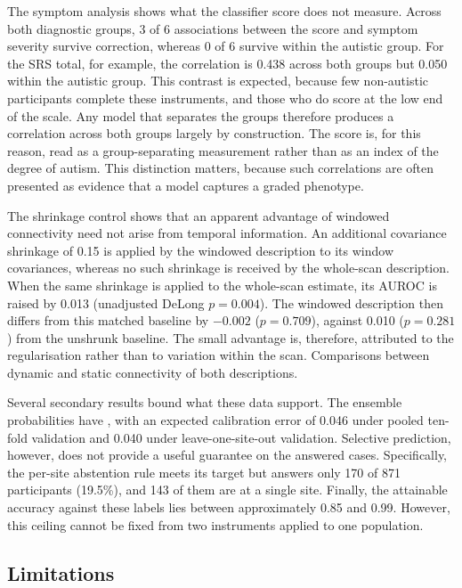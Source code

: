 The symptom analysis shows what the classifier score does not measure. Across both diagnostic
groups, 3 of 6 associations between the score and symptom severity survive correction,
whereas 0 of 6 survive within the autistic group. For the SRS total, for example, the
correlation is 0.438 across both groups but 0.050 within the autistic group. This contrast is
expected, because few non-autistic participants complete these instruments, and those who do
score at the low end of the scale. Any model that separates the groups therefore produces a
correlation across both groups largely by construction. The score is, for this reason, read
as a group-separating measurement rather than as an index of the degree of autism. This
distinction matters, because such correlations are often presented as evidence that a model
captures a graded phenotype.

The shrinkage control shows that an apparent advantage of windowed connectivity need not
arise from temporal information. An additional covariance shrinkage of 0.15 is applied by the
windowed description to its window covariances, whereas no such shrinkage is received by the
whole-scan description. When the same shrinkage is applied to the whole-scan estimate, its
AUROC is raised by 0.013 (unadjusted DeLong $p=0.004$). The windowed description then differs
from this matched baseline by $-0.002$ ($p=0.709$), against 0.010 ($p=0.281$) from the
unshrunk baseline. The small advantage is, therefore, attributed to the regularisation rather
than to variation within the scan. Comparisons between dynamic and static connectivity  of both descriptions.

Several secondary results bound what these data support. The ensemble probabilities have , with an expected calibration error of 0.046 under pooled ten-fold validation and
0.040 under leave-one-site-out validation.  Selective prediction, however, does not provide a useful
guarantee on the answered cases. Specifically, the per-site abstention rule meets its target
but answers only 170 of 871 participants (19.5\%), and 143 of them are at a single site.
Finally, the attainable accuracy against these labels lies between approximately
0.85 and 0.99. However, this ceiling cannot be fixed from two instruments applied to one
population.

\subsection{Limitations}
\label{subsec:limitations}


